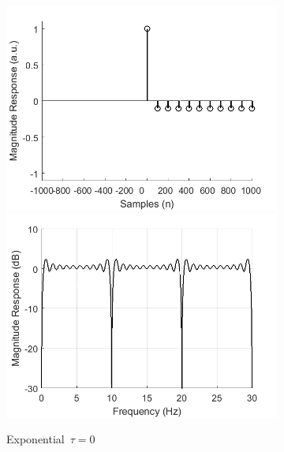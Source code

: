 \documentclass[a4paper]{article}
\begin{document}
\begin{figure}[hbtp]
    \begin{subfigure}{.33\textwidth}
        \includegraphics[width=\textwidth]{img/tau/kernel_exp_0.png}\\
        \includegraphics[width=\textwidth]{img/tau/mag_exp_0.png}
        \caption{Exponential~$\tau=0$}\label{fig:ExpTau0}
    \end{subfigure}
    \begin{subfigure}{.33\textwidth}

\end{subfigure}
\end{figure}
\end{document}
